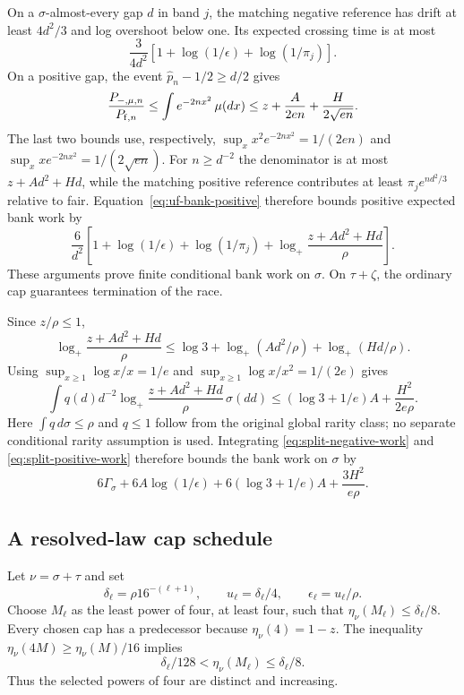 On a $\sigma$-almost-every gap $d$ in band $j$, the matching negative
reference has drift at least $4d^2/3$ and log overshoot below one.
Its expected crossing time is at most
\begin{equation}\label{eq:split-negative-work}
 \frac3{4d^2}[1+\log(1/\epsilon)+\log(1/\pi_j)].
\end{equation}
On a positive gap, the event $\widehat p_n-1/2\ge d/2$ gives
\begin{equation}\label{eq:split-null-laplace}
 \frac{P_{-,\mu,n}}{P_{{\rm f},n}}
 \le\int e^{-2nx^2}\,\mu(dx)
 \le z+\frac A{2en}+\frac H{2\sqrt{en}}.
\end{equation}
The last two bounds use, respectively,
$\sup_xx^2e^{-2nx^2}=1/(2en)$ and
$\sup_xxe^{-2nx^2}=1/(2\sqrt{en})$.
For $n\ge d^{-2}$ the denominator is at most $z+Ad^2+Hd$,
while the matching positive reference contributes at least
$\pi_je^{nd^2/3}$ relative to fair. Equation~\eqref{eq:uf-bank-positive} therefore bounds positive expected bank work by
\begin{equation}\label{eq:split-positive-work}
 \frac6{d^2}\left[
 1+\log(1/\epsilon)+\log(1/\pi_j)
 +\log_+\frac{z+Ad^2+Hd}{\rho}\right].
\end{equation}
These arguments prove finite conditional bank work on $\sigma$.
On $\tau+\zeta$, the ordinary cap guarantees termination of the race.

Since $z/\rho\le1$,
\[
 \log_+\frac{z+Ad^2+Hd}{\rho}
 \le\log3+\log_+(Ad^2/\rho)+\log_+(Hd/\rho).
\]
Using $\sup_{x\ge1}\log x/x=1/e$ and
$\sup_{x\ge1}\log x/x^2=1/(2e)$ gives
\begin{equation}\label{eq:split-surcharge}
 \int q(d)d^{-2}\log_+\frac{z+Ad^2+Hd}{\rho}\,\sigma(dd)
 \le(\log3+1/e)A+\frac{H^2}{2e\rho}.
\end{equation}
Here $\int q\,d\sigma\le\rho$ and $q\le1$ follow from the original
global rarity class; no separate conditional rarity assumption is used.
Integrating \eqref{eq:split-negative-work} and
\eqref{eq:split-positive-work} therefore bounds the bank work on $\sigma$ by
\begin{equation}\label{eq:split-bank-work}
 6\Gamma_\sigma+6A\log(1/\epsilon)
       +6(\log3+1/e)A+\frac{3H^2}{e\rho}.
\end{equation}

\subsection{A resolved-law cap schedule}

Let $\nu=\sigma+\tau$ and set
\[
 \delta_\ell=\rho16^{-(\ell+1)},\qquad
 u_\ell=\delta_\ell/4,\qquad \epsilon_\ell=u_\ell/\rho.
\]
Choose $M_\ell$ as the least power of four, at least four, such that
$\eta_\nu(M_\ell)\le\delta_\ell/8$.
Every chosen cap has a predecessor because $\eta_\nu(4)=1-z$.
The inequality $\eta_\nu(4M)\ge\eta_\nu(M)/16$ implies
\begin{equation}\label{eq:split-cap-selection}
 \delta_\ell/128<\eta_\nu(M_\ell)\le\delta_\ell/8.
\end{equation}
Thus the selected powers of four are distinct and increasing.

